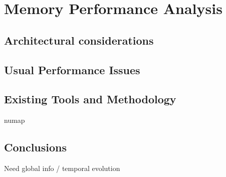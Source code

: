 \chapter{Memory Performance Analysis}

\section{Architectural considerations}

\section{Usual Performance Issues}

\section{Existing Tools and Methodology}

numap\cite{Selva16numap}

\section{Conclusions}

Need global info / temporal evolution
